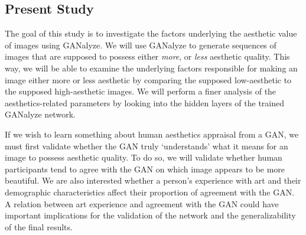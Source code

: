 \documentclass[../main.tex]{subfiles}
\begin{document}
\subsection{Present Study}
The goal of this study is to investigate the factors underlying the aesthetic value of images using GANalyze. We will use GANalyze to generate sequences of images that are supposed to possess either \textit{more}, or \textit{less} aesthetic quality. This way, we will be able to examine the underlying factors responsible for making an image either more or less aesthetic by comparing the supposed low-aesthetic to the supposed high-aesthetic images. We will perform a finer analysis of the aesthetics-related parameters by looking into the hidden layers of the trained GANalyze network.

If we wish to learn something about human aesthetics appraisal from a GAN, we must first validate whether the GAN truly `understands' what it means for an image to possess aesthetic quality. To do so, we will validate whether human participants tend to agree with the GAN on which image appears to be more beautiful. We are also interested whether a person's experience with art and their demographic characteristics affect their proportion of agreement with the GAN. A relation between art experience and agreement with the GAN could have important implications for the validation of the network and the generalizability of the final results.
\end{document}
